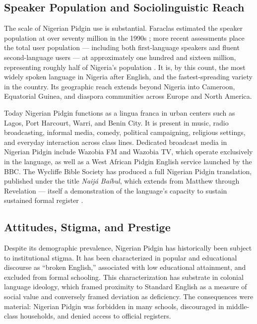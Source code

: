 \documentclass[12pt]{article}
\begin{document}
\subsection{Speaker Population and Sociolinguistic Reach}

The scale of Nigerian Pidgin use is substantial. Faraclas estimated the speaker population at over seventy million in the 1990s \cite{Faraclas1996}; more recent assessments place the total user population --- including both first-language speakers and fluent second-language users --- at approximately one hundred and sixteen million, representing roughly half of Nigeria's population \cite{LewisSimonsFennig2016}. It is, by this count, the most widely spoken language in Nigeria after English, and the fastest-spreading variety in the country. Its geographic reach extends beyond Nigeria into Cameroon, Equatorial Guinea, and diaspora communities across Europe and North America.

Today Nigerian Pidgin functions as a lingua franca in urban centers such as Lagos, Port Harcourt, Warri, and Benin City. It is present in music, radio broadcasting, informal media, comedy, political campaigning, religious settings, and everyday interaction across class lines. Dedicated broadcast media in Nigerian Pidgin include Wazobia FM and Wazobia TV, which operate exclusively in the language, as well as a West African Pidgin English service launched by the BBC. The Wycliffe Bible Society has produced a full Nigerian Pidgin translation, published under the title \textit{Naijá Baíbul}, which extends from Matthew through Revelation --- itself a demonstration of the language's capacity to sustain sustained formal register \cite{Faraclas2013}.

\subsection{Attitudes, Stigma, and Prestige}

Despite its demographic prevalence, Nigerian Pidgin has historically been subject to institutional stigma. It has been characterized in popular and educational discourse as ``broken English,'' associated with low educational attainment, and excluded from formal schooling. This characterization has substrate in colonial language ideology, which framed proximity to Standard English as a measure of social value and conversely framed deviation as deficiency. The consequences were material: Nigerian Pidgin was forbidden in many schools, discouraged in middle-class households, and denied access to official registers.
\end{document}
